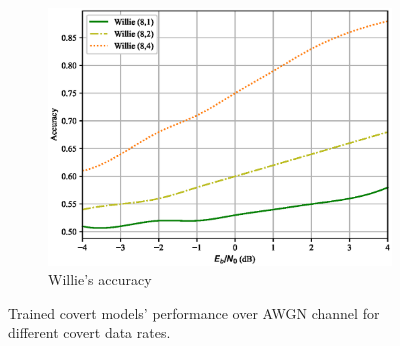 \begin{figure}[th!]
\begin{subfigure}{0.3\textwidth}
		\includegraphics[width=\linewidth]{figs/willie_accuracy_awgn}
		\caption{Willie's accuracy}	
		\label{fig:awgn_resutls_willie}
	\end{subfigure}
	\caption{Trained covert models' performance over AWGN channel for different covert data rates.}
	\label{fig:awgn_results}
\end{figure}
